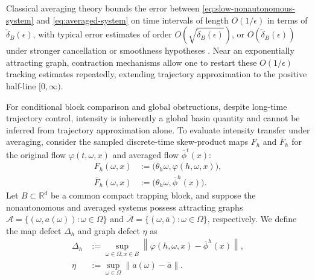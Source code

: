 \documentclass[pdflatex,sn-mathphys-num]{sn-jnl}
\numberwithin{equation}{section}
\theoremstyle{thmstyleone}%
\theoremstyle{definition}
\theoremstyle{remark}
\begin{document}
Classical averaging theory bounds the error between \eqref{eq:slow-nonautonomous-system} and \eqref{eq:averaged-system} on time intervals of length $O(1/\epsilon)$ in terms of $\widetilde\delta_B(\epsilon)$, with typical error estimates of order $O(\sqrt{\widetilde\delta_B(\epsilon)})$, or $O(\widetilde\delta_B(\epsilon))$ under stronger cancellation or smoothness hypotheses \citep{bogoliubov1961asymptotic,verhulst2005methods,sanders2007averaging}. Near an exponentially attracting graph, contraction mechanisms allow one to restart these $O(1/\epsilon)$ tracking estimates repeatedly, extending trajectory approximation to the positive half-line $[0, \infty)$.

For conditional block comparison and global obstructions, despite long-time trajectory control, intensity is inherently a global basin quantity and cannot be inferred from trajectory approximation alone. To evaluate intensity transfer under averaging, consider the sampled discrete-time skew-product maps $F_h$ and $\overline F_h$ for the original flow $\varphi(t,\omega,x)$ and averaged flow $\overline\phi^t(x)$:
\begin{align*}
    F_h(\omega, x) &:= \bigl( \theta_h\omega, \varphi(h,\omega,x) \bigr), \\
    \overline F_h(\omega, x) &:= \bigl( \theta_h\omega, \overline\phi^h(x) \bigr).
\end{align*}
Let $B \subset \mathbb{R}^d$ be a common compact trapping block, and suppose the nonautonomous and averaged systems possess attracting graphs $\mathcal A = \{(\omega, a(\omega)) : \omega \in \Omega\}$ and $\overline{\mathcal A} = \{(\omega, \overline a) : \omega \in \Omega\}$, respectively. We define the map defect $\Delta_h$ and graph defect $\eta$ as
\begin{align}
\label{eq:averaging-map-defect}
    \Delta_h &:= \sup_{\omega\in\Omega, x\in B} \left\| \varphi(h,\omega,x) - \overline\phi^h(x) \right\|, \\
\label{eq:averaging-graph-defect}
    \eta &:= \sup_{\omega\in\Omega} \|a(\omega) - \overline a\|.
\end{align}
\end{document}
